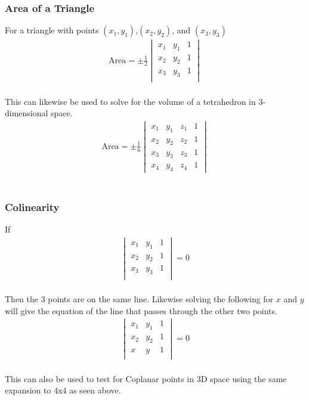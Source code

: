 \documentclass[]{article}
\begin{document}
\subsubsection{Area of a Triangle}
For a triangle with points $(x_1,y_1)$,$(x_2,y_2)$, and $(x_3,y_3)$ \\
\begin{align*}
	\text{Area} = \pm\frac{1}{2}
		\begin{vmatrix}
			x_{1} & y_{1} & 1 \\
			x_{2} & y_{2} & 1 \\
			x_{3} & y_{3} & 1 \\
		\end{vmatrix} 
\end{align*} \\
This can likewise be used to solve for the volume of a 
tetrahedron in 3-dimensional space. \\
\begin{align*}
	\text{Area} = \pm\frac{1}{6}
		\begin{vmatrix}
			x_{1} & y_{1} & z_1 & 1 \\
			x_{2} & y_{2} & z_2 & 1 \\
			x_{3} & y_{3} & z_3 & 1 \\
			x_4 & y_4 & z_4 & 1
		\end{vmatrix} 
\end{align*} \\

\subsubsection{Colinearity}
If \\
\begin{align*}
	\begin{vmatrix}
		x_{1} & y_{1} & 1 \\
		x_{2} & y_{2} & 1 \\
		x_{3} & y_{3} & 1 \\
	\end{vmatrix}
	= 0 
\end{align*} \\
Then the 3 points are on the same line. 
Likewise solving the following for $x$ and $y$ 
will give the equation of the line that passes through the other two points. \\
\begin{align*}
	\begin{vmatrix}
		x_{1} & y_{1} & 1 \\
		x_{2} & y_{2} & 1 \\
		x & y & 1 \\
	\end{vmatrix}
	= 0 
\end{align*} \\
This can also be used to test for Coplanar points in 3D space
using the same expansion to 4x4 as seen above.
\end{document}
